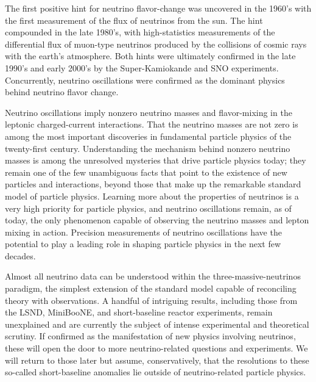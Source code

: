 
The first positive hint for neutrino flavor-change was uncovered in the 1960's with the first measurement of the flux of neutrinos from the sun. The hint compounded in the late 1980's, with high-statistics measurements of the differential flux of muon-type neutrinos produced by the collisions of cosmic rays with the earth's atmosphere. Both hints were ultimately confirmed in the late 1990's and early 2000's by the Super-Kamiokande and SNO experiments. Concurrently, neutrino oscillations were confirmed as the dominant physics behind neutrino flavor change. 

Neutrino oscillations imply nonzero neutrino masses and flavor-mixing in the leptonic charged-current interactions.  That the neutrino masses are not zero is among the most important discoveries in fundamental particle physics of the twenty-first century. Understanding the mechanism behind nonzero neutrino masses is among the unresolved mysteries that drive particle physics today; they remain one of the few unambiguous facts that point to the existence of new particles and interactions, beyond those that make up the remarkable standard model of particle physics. Learning more about the properties of neutrinos is a very high priority for particle physics, and neutrino oscillations remain, as of today, the only phenomenon capable of observing the neutrino masses and lepton mixing in action. Precision measurements of neutrino oscillations have the potential to play a leading role in shaping particle physics in the next few decades. 

Almost all neutrino data can be understood within the three-massive-neutrinos paradigm, the simplest extension of the standard model capable of reconciling theory with observations. A handful of intriguing results, including those from the LSND, MiniBooNE, and short-baseline reactor experiments, remain unexplained and are currently the subject of intense experimental and theoretical scrutiny. If confirmed as the manifestation of new physics involving neutrinos, these will open the door to more neutrino-related questions and experiments. We will return to those later but assume, conservatively, that the resolutions to these so-called short-baseline anomalies lie outside of neutrino-related particle physics. 

